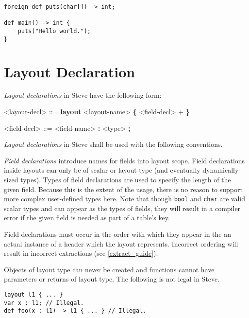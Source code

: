 \noindent\begin{minipage}{\linewidth}
\begin{lstlisting}
foreign def puts(char[]) -> int;

def main() -> int {
	puts("Hello world.");
}
\end{lstlisting}
\end{minipage}
 
\section{Layout Declaration} \label{layout_guide}

\textit{Layout declarations} in Steve have the following form:

\begin{minip}
\begin{grammar}
\singlespace
<layout-decl> ::=
\textbf{layout} <layout-name> 
\textbf{\{}
	<field-decl> +
\textbf{\}}

<field-decl> ::=
<field-name> \textbf{:} <type> \textbf{;}
\end{grammar}
\end{minip}

\textit{Layout declarations} in Steve shall be used with the following conventions.

\textit{Field declarations} introduce names for fields into layout scope. Field declarations inside layouts can only be of scalar or layout type (and eventually dynamically-sized types). Types of field declarations are used to specify the length of the given field. Because this is the extent of the usage, there is no reason to support more complex user-defined types here. Note that though \texttt{bool} and \texttt{char} are valid scalar types and can appear as the types of fields, they will result in a compiler error if the given field is needed as part of a table's key.

Field declarations must occur in the order with which they appear in the an actual instance of a header which the layout represents. Incorrect ordering will result in incorrect extractions (see \ref{extract_guide}).

Objects of layout type can never be created and functions cannot have parameters or returns of layout type. The following is not legal in Steve.

\noindent\begin{minipage}{\linewidth}
\begin{lstlisting}
layout l1 { ... }
var x : l1; // Illegal.
def foo(x : l1) -> l1 { ... } // Illegal.
\end{lstlisting}
\end{minipage}

